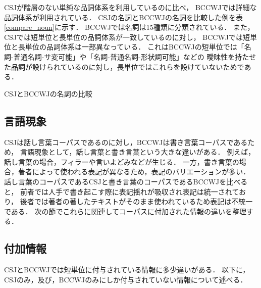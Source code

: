 \documentclass[japanese]{jnlp_1.4}
\begin{document}
CSJが階層のない単純な品詞体系を利用しているのに比べ，
BCCWJでは詳細な品詞体系が利用されている．
CSJの名詞とBCCWJの名詞を比較した例を表\ref{compare_noun}に示す．
BCCWJでは名詞は15種類に分類されている．
また，CSJでは短単位と長単位の品詞体系が一致しているのに対し，
BCCWJでは短単位と長単位の品詞体系は一部異なっている．
これはBCCWJの短単位では「名詞-普通名詞-サ変可能」や「名詞-普通名詞-形状詞可能」などの
曖昧性を持たせた品詞が設けられているのに対し，長単位ではこれらを設けていないためである．

\begin{table}[t]
\caption{CSJとBCCWJの名詞の比較}
\label{compare_noun}

\end{table}


\subsection{言語現象}
\label{lang_diff}

CSJは話し言葉コーパスであるのに対し，BCCWJは書き言葉コーパスであるため，
言語現象として，話し言葉と書き言葉という大きな違いがある．
例えば，話し言葉の場合，フィラーや言いよどみなどが生じる．
一方，書き言葉の場合，著者によって使われる表記が異なるため，表記のバリエーションが多い．
話し言葉のコーパスであるCSJと書き言葉のコーパスであるBCCWJを比べると，
前者では人手で書き起こす際に表記揺れが吸収され表記は統一されており，
後者では著者の著したテキストがそのまま使われているため表記は不統一である．
次の節でこれらに関連してコーパスに付加された情報の違いを整理する．


\subsection{付加情報}
\label{additional_annotation}

CSJとBCCWJでは短単位に付与されている情報に多少違いがある．
以下に，CSJのみ，及び，BCCWJのみにしか付与されていない情報について述べる．
\end{document}
